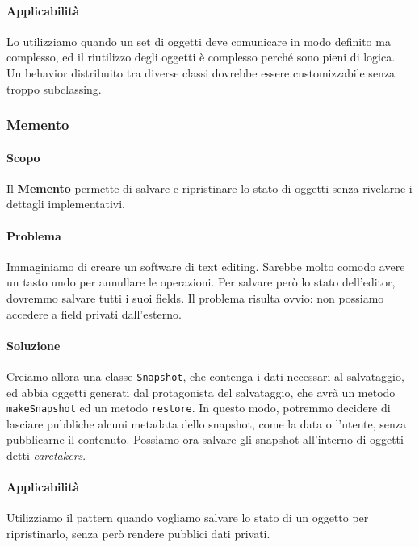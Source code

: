 \documentclass[11pt]{article}
\newcommand{\code}[1]{\texttt{#1}}
\begin{document}
\paragraph{Applicabilità}
Lo utilizziamo quando un set di oggetti deve comunicare in modo definito ma complesso, ed il riutilizzo degli oggetti è complesso perché sono pieni di logica. Un behavior distribuito tra diverse classi dovrebbe essere customizzabile senza troppo subclassing. 

\subsubsection{Memento}
\paragraph{Scopo}
Il \textbf{Memento} permette di salvare e ripristinare lo stato di oggetti senza rivelarne i dettagli implementativi. 
\paragraph{Problema}
Immaginiamo di creare un software di text editing. Sarebbe molto comodo avere un tasto undo per annullare le operazioni. Per salvare però lo stato dell'editor, dovremmo salvare tutti i suoi fields. Il problema risulta ovvio: non possiamo accedere a field privati dall'esterno. 
\paragraph{Soluzione}
Creiamo allora una classe \code{Snapshot}, che contenga i dati necessari al salvataggio, ed abbia oggetti generati dal protagonista del salvataggio, che avrà un metodo \code{makeSnapshot} ed un metodo \code{restore}. In questo modo, potremmo decidere di lasciare pubbliche alcuni metadata dello snapshot, come la data o l'utente, senza pubblicarne il contenuto. Possiamo ora salvare gli snapshot all'interno di oggetti detti \textit{caretakers}. 
\paragraph{Applicabilità}
Utilizziamo il pattern quando vogliamo salvare lo stato di un oggetto per ripristinarlo, senza però rendere pubblici dati privati. 

\printglossary
\end{document}

